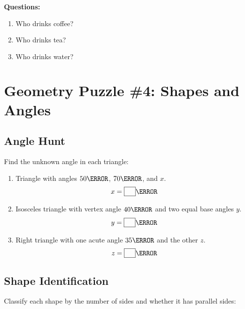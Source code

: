 \documentclass[
    language=english,
    doctype=activity-book,
    institution=none,
]{../../omnilatex}
\begin{document}
\noindent\textbf{Questions:}
\begin{enumerate}
    \item Who drinks coffee? \underline{\hspace{3cm}}
    \item Who drinks tea? \underline{\hspace{3cm}}
    \item Who drinks water? \underline{\hspace{3cm}}
\end{enumerate}

\section{Geometry Puzzle \#4: Shapes and Angles}

\subsection{Angle Hunt}

Find the unknown angle in each triangle:

\begin{enumerate}
    \item Triangle with angles $50\degree$, $70\degree$, and $x$.
    \[x = \boxed{\phantom{00}}\degree\]

    \item Isosceles triangle with vertex angle $40\degree$ and two equal base angles $y$.
    \[y = \boxed{\phantom{00}}\degree\]

    \item Right triangle with one acute angle $35\degree$ and the other $z$.
    \[z = \boxed{\phantom{00}}\degree\]
\end{enumerate}

\subsection{Shape Identification}

Classify each shape by the number of sides and whether it has parallel sides:
\end{document}
